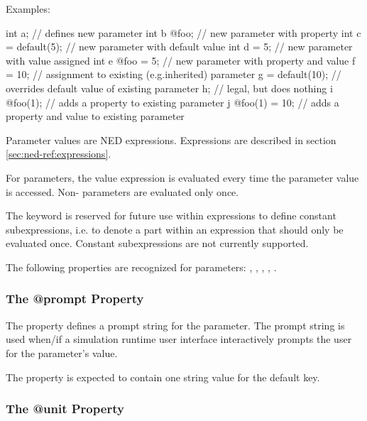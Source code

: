 Examples:

\begin{ned}
int a;           // defines new parameter
int b @foo;      // new parameter with property
int c = default(5); // new parameter with default value
int d = 5;       // new parameter with value assigned
int e @foo = 5;  // new parameter with property and value
f = 10;          // assignment to existing (e.g.inherited) parameter
g = default(10); // overrides default value of existing parameter
h;               // legal, but does nothing
i @foo(1);       // adds a property to existing parameter
j @foo(1) = 10;  // adds a property and value to existing parameter
\end{ned}

Parameter values are NED expressions. Expressions are described in section
\ref{sec:ned-ref:expressions}.

For  parameters, the value expression is evaluated every
time the parameter value is accessed. Non- parameters
are evaluated only once.

\begin{note}
The  keyword is reserved for future use within expressions
to define constant subexpressions, i.e. to denote a part within
an expression that should only be evaluated once. Constant subexpressions
are not currently supported.
\end{note}

The following properties are recognized for parameters: ,
, , , .


\subsubsection{The @prompt Property}
\label{sec:ned-ref:prompt-property}

The  property defines a prompt string for the parameter. The
prompt string is used when/if a simulation runtime user interface
interactively prompts the user for the parameter's value.

The  property is expected to contain one string value for the
default key.


\subsubsection{The @unit Property}
\label{sec:ned-ref:unit-property}

